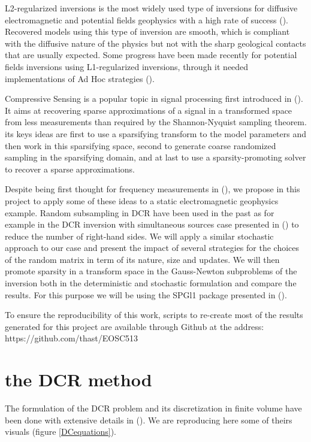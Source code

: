 \documentclass[twoside]{article}
\begin{document}
L2-regularized inversions is the most widely used type of inversions for diffusive electromagnetic and potential fields geophysics with a high rate of success (\cite{Haber:2014}). Recovered models using this type of inversion are smooth, which is compliant with the diffusive nature of the physics but not with the sharp geological contacts that are usually expected. Some progress have been made recently for potential fields inversions using L1-regularized inversions, through it needed implementations of Ad Hoc strategies (\cite{Fournier:2015}).  

Compressive Sensing is a popular topic in signal processing first introduced in (\cite{CRT:2006}). It aims at recovering sparse approximations of a signal in a transformed space from less measurements than required by the Shannon-Nyquist sampling theorem. its keys ideas are first to use a sparsifying transform to the model parameters and then work in this sparsifying space, second to generate coarse randomized sampling in the sparsifying domain, and at last to use a sparsity-promoting solver to recover a sparse approximations.

Despite being first thought for frequency measurements in (\cite{CRT:2006}), we propose in this project to apply some of these ideas to a static electromagnetic geophysics example. Random subsampling in DCR have been used in the past as for example in the DCR inversion with simultaneous sources case presented in (\cite{HCH:2012}) to reduce the number of right-hand sides. We will apply a similar stochastic approach to our case and present the impact of several strategies for the choices of the random matrix in term of its nature, size and updates. We will then promote sparsity in a transform space in the Gauss-Newton subproblems of the inversion both in the deterministic and stochastic formulation and compare the results. For this purpose we will be using the SPGl1 package presented in (\cite{BF:2008}).

To ensure the reproducibility of this work, scripts to re-create most of the results generated for this project are available through Github at the address: https://github.com/thast/EOSC513


\newpage
\section{the DCR method}

The formulation of the DCR problem and its discretization in finite volume have been done with extensive details in (\cite{CHO:2016}). We are reproducing here some of theirs visuals (figure \ref{DCequations}).
\end{document}
